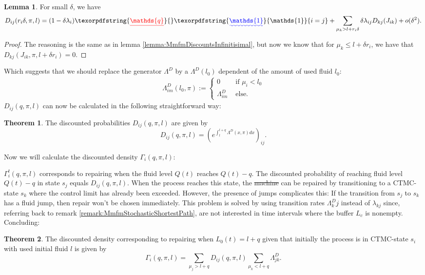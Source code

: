 \documentclass[a4paper]{thesis}
\theoremstyle{definition}
\newtheorem{theorem}{Theorem}[chapter] %
\newtheorem{lemma}{Lemma}[chapter]  %
\providecommand{\DIFaddtex}[1]{{\protect\color{blue}\uwave{#1}}} %
\providecommand{\DIFdeltex}[1]{{\protect\color{red}\sout{#1}}}                      %
\providecommand{\DIFaddbegin}{} %
\providecommand{\DIFaddend}{} %
\providecommand{\DIFdelbegin}{} %
\providecommand{\DIFdelend}{} %
\providecommand{\DIFadd}[1]{\texorpdfstring{\DIFaddtex{#1}}{#1}} %
\providecommand{\DIFdel}[1]{\texorpdfstring{\DIFdeltex{#1}}{}} %
\newcommand{\DIFscaledelfig}{0.5}
\newlength{\DIFdelgraphicswidth} %
\newlength{\DIFdelgraphicsheight} %
\newcommand{\DIFaddincludegraphics}[2][]{{\color{blue}\fbox{\DIFOincludegraphics[#1]{#2}}}} %
\newcommand{\DIFdelincludegraphics}[2][]{%
	\sbox{\DIFdelgraphicsbox}{\DIFOincludegraphics[#1]{#2}}%
	\settoboxwidth{\DIFdelgraphicswidth}{\DIFdelgraphicsbox} %
	\settoboxtotalheight{\DIFdelgraphicsheight}{\DIFdelgraphicsbox} %
	\scalebox{\DIFscaledelfig}{%
		\parbox[b]{\DIFdelgraphicswidth}{\usebox{\DIFdelgraphicsbox}\\[-\baselineskip] \rule{\DIFdelgraphicswidth}{0em}}\llap{\resizebox{\DIFdelgraphicswidth}{\DIFdelgraphicsheight}{%
				\setlength{\unitlength}{\DIFdelgraphicswidth}%
				\begin{picture}(1,1)%
				\thicklines\linethickness{2pt} %
				{\color[rgb]{1,0,0}\put(0,0){\framebox(1,1){}}}%
				{\color[rgb]{1,0,0}\put(0,0){\line( 1,1){1}}}%
				{\color[rgb]{1,0,0}\put(0,1){\line(1,-1){1}}}%
				\end{picture}%
			}\hspace*{3pt}}} %
} %
\DeclareRobustCommand{\DIFaddbegin}{\DIFOaddbegin \let\includegraphics\DIFaddincludegraphics} %
\DeclareRobustCommand{\DIFaddend}{\DIFOaddend \let\includegraphics\DIFOincludegraphics} %
\DeclareRobustCommand{\DIFdelbegin}{\DIFOdelbegin \let\includegraphics\DIFdelincludegraphics} %
\DeclareRobustCommand{\DIFdelend}{\DIFOaddend \let\includegraphics\DIFOincludegraphics} %
\begin{document}
	\begin{lemma}
		For small $\delta$, we have
		\[
		D_{ij}(r_i\delta,\pi,l)=(1-\delta\lambda_i)\DIFdelbegin \DIFdel{\mathds{q}}\DIFdelend \DIFaddbegin \DIFadd{\mathds{1}}\DIFaddend \{i=j\}+\sum\limits_{\mu_k>l+r_i\delta}\delta\lambda_{ij}D_{kj}(J_{ik})+o(\delta^2).
		\]
		\begin{proof}
			The reasoning is the same as in lemma \ref{lemma:MmfmDiscountsInfinitisimal}, but now we know that for $\mu_k\leq l+\delta r_i$, we have that $D_{kj}(J_{ik},\pi,l+\delta r_i)=0$.
		\end{proof}
	\end{lemma}
	Which suggests that we should replace the generator $\Lambda^D$ by a $\Lambda^D(l_0)$ dependent of the amount of used fluid $l_0$:
	\begin{equation}
	\begin{split}
	\Lambda^D_{im}(l_0,\pi):=\begin{cases}
	0&\text{ if }\mu_i<l_0\\
	\Lambda^D_{im}&\text{ else.}
	\end{cases}
	\end{split}
	\end{equation}
	$D_{ij}(q, \pi,l)$ can now be calculated in the following straightforward way:
	\begin{theorem}
		The discounted probabilities $D_{ij}(q, \pi,l)$ are given by
		\[
		D_{ij}(q, \pi,l)=\left(e^{\int_l^{l+q}\Lambda^D(x,\pi)dx}\right)_{ij}.
		\]
	\end{theorem}
	Now we will calculate the discounted density $\Gamma_i(q,\pi,l)$:
	
	$\Gamma_i^t(q,\pi,l)$ corresponds to repairing when the fluid level $Q(t)$ reaches $Q(t)-q$.
	The discounted probability of reaching fluid level $Q(t)-q$ in state $s_j$ equals $D_{ij}(q, \pi,l)$.
	When the process reaches this state, the \DIFdelbegin \DIFdel{machine }\DIFdelend \DIFaddbegin \DIFadd{asset }\DIFaddend can be repaired by transitioning to a CTMC-state $s_k$ where the control limit has already been exceeded.
	However, the presence of jumps complicates this:
	If the transition from $s_j$ to $s_k$ has a fluid jump, then repair won't be chosen immediately.
	This problem is solved by using transition rates $\Lambda^D_kj$ instead of $\lambda_{kj}$ since, referring back to remark \ref{remark:MmfmStochasticShortestPath}, are not interested in time intervals where the buffer $L_c$ is nonempty.
	Concluding:
	
	\begin{theorem}
		The discounted density corresponding to repairing when $L_0(t)=l+q$ given that initially the process is in CTMC-state $s_i$ with used initial fluid $l$ is given by
		\[
		\Gamma_i(q,\pi,l)=\sum\limits_{\mu_j>l+q}D_{ij}(q,\pi,l)\sum\limits_{\mu_k<l+q}\Lambda_{jk}^D.
		\]
	\end{theorem}
	
\end{document}
